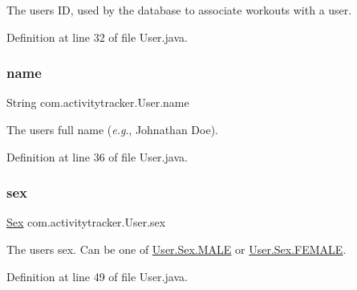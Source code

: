 The user\textquotesingle{}s ID, used by the database to associate workouts with a user. 

Definition at line 32 of file User.\+java.

\mbox{\label{classcom_1_1activitytracker_1_1_user_a49bfb4c8ebf8b7a377df01b5f0b2d7bc}} 
\subsubsection{\texorpdfstring{name}{name}}
{\footnotesize\ttfamily String com.\+activitytracker.\+User.\+name\hspace{0.3cm}{\ttfamily [private]}}

The user\textquotesingle{}s full name ({\itshape e.\+g}., Johnathan Doe). 

Definition at line 36 of file User.\+java.

\mbox{\label{classcom_1_1activitytracker_1_1_user_adcbddd2e965af4e227f7cf0582a3e13d}} 
\subsubsection{\texorpdfstring{sex}{sex}}
{\footnotesize\ttfamily \mbox{\hyperlink{enumcom_1_1activitytracker_1_1_user_1_1_sex}{Sex}} com.\+activitytracker.\+User.\+sex\hspace{0.3cm}{\ttfamily [private]}}

The user\textquotesingle{}s sex. Can be one of \mbox{\hyperlink{enumcom_1_1activitytracker_1_1_user_1_1_sex_ad3b626a38bd4615eb621d75b939f412d}{User.\+Sex.\+M\+A\+LE}} or \mbox{\hyperlink{enumcom_1_1activitytracker_1_1_user_1_1_sex_a5c22ece8a4df71ed5202cd492990a752}{User.\+Sex.\+F\+E\+M\+A\+LE}}. 

Definition at line 49 of file User.\+java.

\mbox{\label{classcom_1_1activitytracker_1_1_user_a8a30c6c08983e513b462bcc035434c9e}} 
